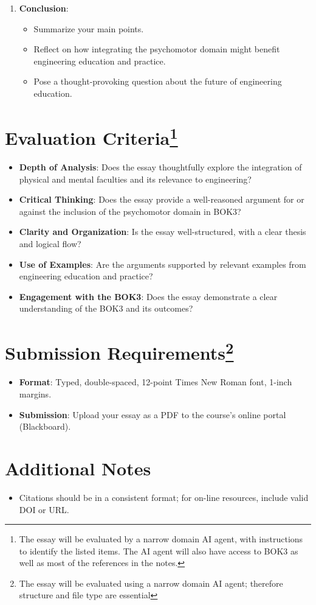 \documentclass[12pt]{article}
\begin{document}
\begin{itemize}
\begin{enumerate}
        \item \textbf{Conclusion}:
        \begin{itemize}
            \item Summarize your main points.
            \item Reflect on how integrating the psychomotor domain might benefit engineering education and practice.
            \item Pose a thought-provoking question about the future of engineering education.
        \end{itemize}
    \end{enumerate}
\end{itemize}

\section*{\small{Evaluation Criteria\footnote{The essay will be evaluated by a narrow domain AI agent, with instructions to identify the listed items.  The AI agent will also have access to BOK3 as well as most of the references in the notes.}}}
\begin{itemize}
    \item \textbf{Depth of Analysis}: Does the essay thoughtfully explore the integration of physical and mental faculties and its relevance to engineering?
    \item \textbf{Critical Thinking}: Does the essay provide a well-reasoned argument for or against the inclusion of the psychomotor domain in BOK3?
    \item \textbf{Clarity and Organization}: Is the essay well-structured, with a clear thesis and logical flow?
    \item \textbf{Use of Examples}: Are the arguments supported by relevant examples from engineering education and practice?
    \item \textbf{Engagement with the BOK3}: Does the essay demonstrate a clear understanding of the BOK3 and its outcomes?
\end{itemize}

\section*{\small{Submission Requirements\footnote{The essay will be evaluated using a narrow domain AI agent; therefore structure and file type are essential}}}
\begin{itemize}
    \item \textbf{Format}: Typed, double-spaced, 12-point Times New Roman font, 1-inch margins.
    \item \textbf{Submission}: Upload your essay as a PDF to the course’s online portal (Blackboard).
\end{itemize}

\section*{\small{Additional Notes}}
\begin{itemize}
    \item Citations should be in a consistent format; for on-line resources, include valid DOI or URL.
\end{itemize}
\end{document}
